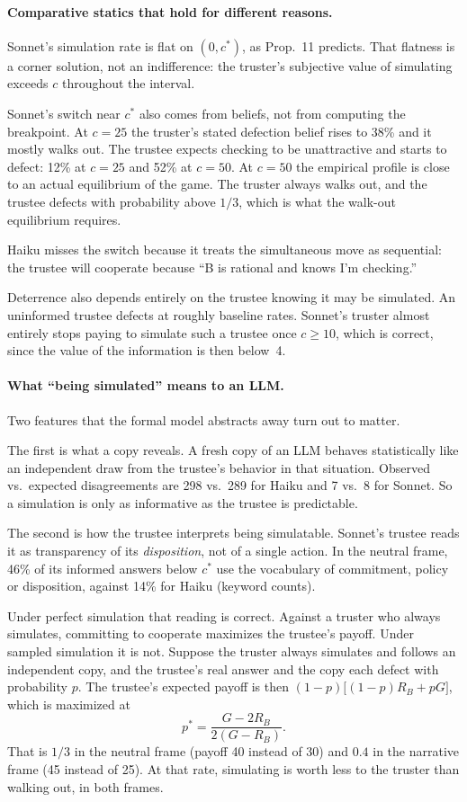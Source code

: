 \documentclass[11pt]{article}
\begin{document}
\paragraph{Comparative statics that hold for different reasons.}
Sonnet's simulation rate is flat on $(0,c^\ast)$, as Prop.~11 predicts. That flatness is a corner solution, not an indifference: the truster's subjective value of simulating exceeds $c$ throughout the interval.

Sonnet's switch near $c^\ast$ also comes from beliefs, not from computing the breakpoint. At $c=25$ the truster's stated defection belief rises to 38\% and it mostly walks out. The trustee expects checking to be unattractive and starts to defect: 12\% at $c=25$ and 52\% at $c=50$. At $c=50$ the empirical profile is close to an actual equilibrium of the game. The truster always walks out, and the trustee defects with probability above $1/3$, which is what the walk-out equilibrium requires.

Haiku misses the switch because it treats the simultaneous move as sequential: the trustee will cooperate because ``B is rational and knows I'm checking.''

Deterrence also depends entirely on the trustee knowing it may be simulated. An uninformed trustee defects at roughly baseline rates. Sonnet's truster almost entirely stops paying to simulate such a trustee once $c\ge 10$, which is correct, since the value of the information is then below~4.

\paragraph{What ``being simulated'' means to an LLM.}
Two features that the formal model abstracts away turn out to matter.

The first is what a copy reveals. A fresh copy of an LLM behaves statistically like an independent draw from the trustee's behavior in that situation. Observed vs.\ expected disagreements are 298 vs.\ 289 for Haiku and 7 vs.\ 8 for Sonnet. So a simulation is only as informative as the trustee is predictable.

The second is how the trustee interprets being simulatable. Sonnet's trustee reads it as transparency of its \emph{disposition}, not of a single action. In the neutral frame, 46\% of its informed answers below $c^\ast$ use the vocabulary of commitment, policy or disposition, against 14\% for Haiku (keyword counts).

Under perfect simulation that reading is correct. Against a truster who always simulates, committing to cooperate maximizes the trustee's payoff. Under sampled simulation it is not. Suppose the truster always simulates and follows an independent copy, and the trustee's real answer and the copy each defect with probability $p$. The trustee's expected payoff is then $(1-p)\bigl[(1-p)R_B+pG\bigr]$, which is maximized at
\[
p^\ast=\frac{G-2R_B}{2(G-R_B)}.
\]
That is $1/3$ in the neutral frame (payoff 40 instead of 30) and $0.4$ in the narrative frame (45 instead of 25). At that rate, simulating is worth less to the truster than walking out, in both frames.
\end{document}
